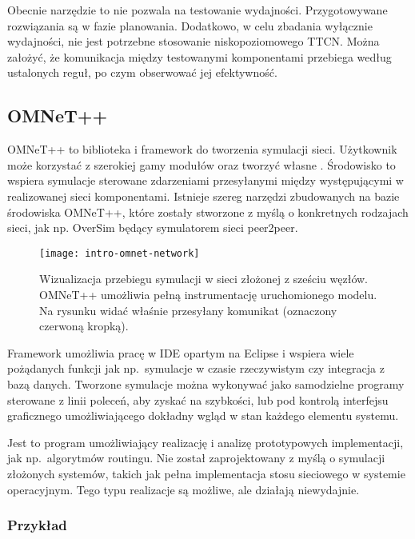 \documentclass[00-praca-magisterska.tex]{subfiles}
\begin{document}
Obecnie narzędzie to nie pozwala na testowanie wydajności. Przygotowywane
rozwiązania są w fazie planowania. Dodatkowo, w celu zbadania wyłącznie
wydajności, nie jest potrzebne stosowanie niskopoziomowego TTCN. Można założyć,
że komunikacja między testowanymi komponentami przebiega według ustalonych
reguł, po czym obserwować jej efektywność.

\subsection{OMNeT++}
\label{omnet}

OMNeT++ to biblioteka i framework do tworzenia symulacji sieci. Użytkownik może korzystać z
szerokiej gamy modułów oraz tworzyć własne \cite{omnet-main}. Środowisko to
wspiera symulacje sterowane zdarzeniami przesyłanymi między występującymi w
realizowanej sieci komponentami. Istnieje szereg narzędzi zbudowanych na bazie
środowiska OMNeT++, które zostały stworzone z myślą o konkretnych rodzajach
sieci, jak np. OverSim będący symulatorem sieci peer2peer.

\begin{figure}
\begin{center}
\leavevmode
\texttt{[image: intro-omnet-network]}
\end{center}
\caption{Wizualizacja przebiegu symulacji w sieci złożonej z sześciu węzłów.
OMNeT++ umożliwia pełną instrumentację uruchomionego modelu. Na rysunku widać
właśnie przesyłany komunikat (oznaczony czerwoną kropką).}
\label{fig:intro-omnet-network}
\end{figure}

Framework umożliwia pracę w IDE opartym na Eclipse i wspiera wiele pożądanych
funkcji jak np.~symulacje w czasie rzeczywistym czy integracja z bazą danych.
Tworzone symulacje można wykonywać jako samodzielne programy sterowane z linii
poleceń, aby zyskać na szybkości, lub pod kontrolą interfejsu graficznego
umożliwiającego dokładny wgląd w stan każdego elementu systemu.

Jest to program umożliwiający realizację i analizę prototypowych implementacji,
jak np.~algorytmów routingu. Nie został zaprojektowany z myślą o symulacji
złożonych systemów, takich jak pełna implementacja stosu sieciowego w systemie
operacyjnym. Tego typu realizacje są możliwe, ale działają niewydajnie.

\subsubsection{Przykład}
\end{document}
